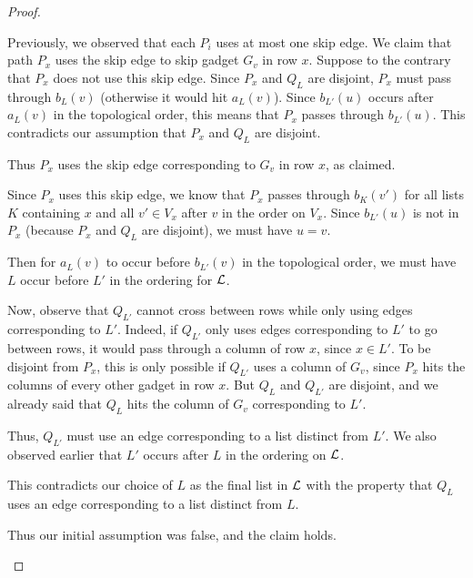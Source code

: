 \documentclass[11pt]{article}
\theoremstyle{definition}
\begin{document}
\begin{proof}
\begin{claimproof}
            Previously, we observed that each $P_i$ uses at most one skip edge.
            We claim that path $P_x$ uses the skip edge to skip gadget $G_v$ in row $x$.
            Suppose to the contrary that $P_x$ does not use this skip edge.
            Since $P_x$ and $Q_L$ are disjoint, $P_x$ must pass through $b_L(v)$ (otherwise it would hit $a_L(v)$).
            Since $b_{L'}(u)$ occurs after $a_L(v)$ in the topological order, this means that $P_x$ passes through $b_{L'}(u)$.
            This contradicts our assumption that $P_x$ and $Q_L$ are disjoint.

            Thus $P_x$ uses the skip edge corresponding to $G_v$ in row $x$, as claimed.

            Since $P_x$ uses this skip edge, we know that $P_x$ passes through $b_K(v')$ for all lists $K$ containing $x$ and all $v'\in V_x$ after $v$ in the order on $V_x$.
            Since $b_{L'}(u)$ is not in $P_x$ (because $P_x$ and $Q_L$ are disjoint), we must have $u=v$.

            Then for $a_L(v)$ to occur before $b_{L'}(v)$ in the topological order, we must have $L$ occur before $L'$ in the ordering for $\cal{L}$.

            Now, observe that $Q_{L'}$ cannot cross between rows while only using edges corresponding to $L'$.
            Indeed, if $Q_{L'}$ only uses edges corresponding to $L'$ to go between rows, it would pass through a column of row $x$, since $x\in L'$.
            To be disjoint from $P_x$, this is only possible if $Q_{L'}$ uses a column of $G_v$, since $P_x$ hits the columns of every other gadget in row $x$. 
            But $Q_{L}$ and $Q_{L'}$ are disjoint, and we already said that $Q_L$ hits the column of $G_v$ corresponding to $L'$.

            Thus, $Q_{L'}$ must use an edge corresponding to a list distinct from $L'$.
            We also observed earlier that $L'$ occurs after $L$ in the ordering on $\cal{L}$.

            This contradicts our choice of $L$ as the final list in $\cal{L}$ with the property that $Q_L$ uses an edge corresponding to a list distinct from $L$.

            Thus our initial assumption was false, and the claim holds.            
        \end{claimproof}


\end{proof}
\end{document}
